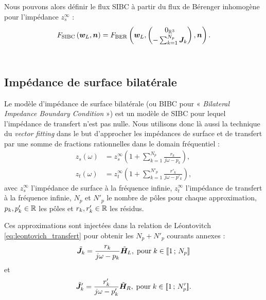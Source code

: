 Nous pouvons alors définir le flux SIBC à partir du flux de Bérenger
inhomogène pour l'impédance $z_s^\infty$ :
\begin{align}
	F_\mathrm{SIBC}\left(\bm{w}_L,\bm{n}\right) = 
	F_\mathrm{BER}\left(\bm{w}_L,\begin{pmatrix}
		0_{\mathbb{R}^{3}} \\
		- \sum_{k = 1}^{N_p} \bm{J}_k
		\end{pmatrix},\bm{n}\right) .
\end{align}
\\



\subsection{Impédance de surface bilatérale}
\label{ssect:bibc}

Le modèle d'impédance de surface bilatérale (ou BIBC pour
« \textit{Bilateral Impedance Boundary Condition} »)
est un modèle de SIBC pour lequel l'impédance de transfert n'est pas nulle.
Nous utilisons donc là aussi la technique du \textit{vector fitting} \cite{772353}
dans le but d'approcher les impédances de surface et de transfert
par une somme de fractions
rationnelles dans le domain fréquentiel :
\begin{subequations}
\begin{align}
z_s (\omega) &= z_s^\infty \left( 1 +
\sum_{k = 1}^{N_p} \frac{r_k}{j \omega - p_k} \right) , \\
z_t (\omega) &= z_t^\infty \left( 1 +
\sum_{k = 1}^{N'_p} \frac{r'_k}{j \omega - p'_k} \right)
\label{eq:impedance_surface_transfert_vf} ,
\end{align}
\end{subequations}
avec $z_s^\infty$ l'impédance de surface à la fréquence infinie,
$z_t^\infty$ l'impédance de transfert à la fréquence infinie,
$N_p$ et $N'_p$ le nombre de pôles pour chaque approximation, $p_k, p'_k \in \mathbb{R}$
les pôles et $r_k, r'_k \in \mathbb{R}$ les résidus.

Ces approximations sont injectées dans la relation de Léontovitch
\eqref{eq:leontovich_transfert} pour obtenir les
$N_p + N'_p$ courants annexes :
\begin{align}
\tilde{\bm{J}}_k =  \frac{r_k}{j \omega - p_k} \tilde{\bm{H}}_L ,
\; \mathrm{pour} \; k \in \lbrack\!\lbrack1\,;\,N_p\rbrack\!\rbrack 
\end{align}
et
\begin{align}
\tilde{\bm{J}}'_k =  \frac{r'_k}{j \omega - p'_k} \tilde{\bm{H}}_R ,
\; \mathrm{pour} \; k \in \lbrack\!\lbrack1\,;\,N'_p\rbrack\!\rbrack .
\end{align}

